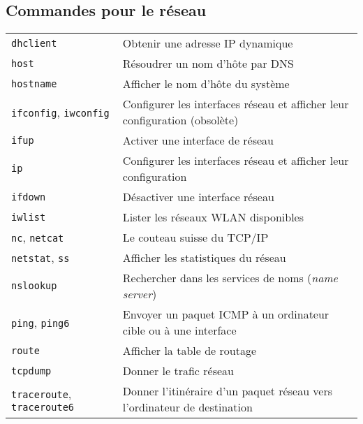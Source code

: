 \documentclass[10pt,a4paper]{article}
\begin{document}
\begin{multicols}{2}

\section{Commandes pour le réseau}
\begin{tabular}{ p{2.5cm} p{8.5cm} }
  \hline
  \texttt{dhclient} & Obtenir une adresse IP dynamique \\
  \rowcolor{Gray}
  \texttt{host} & Résoudrer un nom d'hôte par DNS \\
  \texttt{hostname} & Afficher le nom d'hôte du système \\
  \rowcolor{Gray}
  \texttt{ifconfig}, \texttt{iwconfig} & Configurer les interfaces réseau et afficher leur confi\-guration (obsolète)\\
  \texttt{ifup} & Activer une interface de réseau\\
  \rowcolor{Gray}
  \texttt{ip} & Configurer les interfaces réseau et afficher leur confi\-guration\\
  \texttt{ifdown} & Désactiver une interface réseau \\
  \rowcolor{Gray}
  \texttt{iwlist} & Lister les réseaux WLAN disponibles\\
  \texttt{nc}, \texttt{netcat} & Le couteau suisse du TCP/IP \\
  \rowcolor{Gray}
  \texttt{netstat}, \texttt{ss} & Afficher les statistiques du réseau \\
  \texttt{nslookup} & Rechercher dans les services de noms (\textit{name server}) \\
  \rowcolor{Gray}
  \texttt{ping}, \texttt{ping6} & Envoyer un paquet ICMP à un ordinateur cible ou à une interface\\
  \texttt{route} & Afficher la table de routage \\
  \rowcolor{Gray}
  \texttt{tcpdump} & Donner le trafic réseau \\
  \texttt{traceroute}, \texttt{traceroute6} & Donner l'itinéraire d'un paquet réseau vers \newline l'ordinateur de destination \\
  \hline
\end{tabular}

\hfill


\end{multicols}
\end{document}

